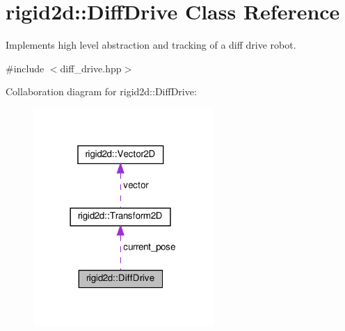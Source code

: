 \hypertarget{classrigid2d_1_1DiffDrive}{}\section{rigid2d\+:\+:Diff\+Drive Class Reference}
\label{classrigid2d_1_1DiffDrive}


Implements high level abstraction and tracking of a diff drive robot.  




{\ttfamily \#include $<$diff\+\_\+drive.\+hpp$>$}



Collaboration diagram for rigid2d\+:\+:Diff\+Drive\+:
\nopagebreak
\begin{figure}[H]
\begin{center}
\leavevmode
\includegraphics[width=194pt]{classrigid2d_1_1DiffDrive__coll__graph}
\end{center}
\end{figure}
